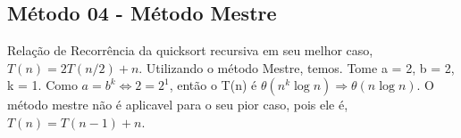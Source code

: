 \subsection{Método 04 - Método Mestre}
Relação de Recorrência da quicksort recursiva em seu melhor caso, $T(n) = 2T(n/2) + n$. Utilizando o método Mestre, temos.
Tome a = 2, b = 2, k = 1. Como $a = b^k \Leftrightarrow 2 = 2^1$, então o T(n) é $\theta(n^k \log{n}) \Rightarrow \theta(n \log{n})$.
O método mestre não é aplicavel para o seu pior caso, pois ele é, $T(n) = T(n-1) + n$.